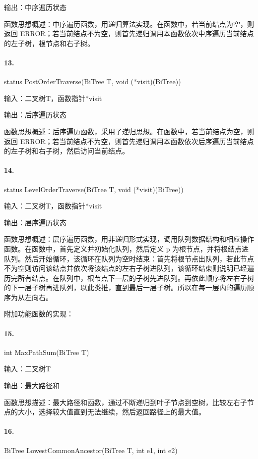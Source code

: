 \documentclass[supercite]{Experimental_Report}
\theoremstyle{definition}
\begin{document}
输出：中序遍历状态

函数思想概述：中序遍历函数，用递归算法实现。在函数中，若当前结点为空，则返回 ERROR；若当前结点不为空，则首先递归调用本函数依次中序遍历当前结点的左子树，根节点和右子树。

\paragraph{13.}status PostOrderTraverse(BiTree T, void (*visit)(BiTree))

输入：二叉树T，函数指针*visit

输出：后序遍历状态

函数思想概述：后序遍历函数，采用了递归思想。在函数中，若当前结点为空，则返回 ERROR；若当前结点不为空，则首先递归调用本函数依次后序遍历当前结点的左子树和右子树，然后访问当前结点。

\paragraph{14.}status LevelOrderTraverse(BiTree T, void (*visit)(BiTree))

输入：二叉树T，函数指针*visit

输出：层序遍历状态

函数思想概述：层序遍历函数，用非递归形式实现，调用队列数据结构和相应操作函数。在函数中，首先定义并初始化队列，然后定义 p 为根节点，并将根结点进队列。然后开始循环，该循环在队列为空时结束：首先将根节点出队列，若此节点不为空则访问该结点并依次将该结点的左右子树进队列，该循环结束则说明已经遍历完所有结点。在队列中，根节点下一层的子树先进队列。再依此顺序将左右子树的下一层子树再进队列，以此类推，直到最后一层子树。所以在每一层内的遍历顺序为从左向右。

附加功能函数的实现：

\paragraph{15.}int MaxPathSum(BiTree T)

输入：二叉树T

输出：最大路径和

函数思想描述：最大路径和函数，通过不断递归到叶子节点到空树，比较左右子节点的大小，选择较大值直到无法继续，然后返回路径上的最大值。

\paragraph{16.}BiTree LowestCommonAncestor(BiTree T, int e1, int e2)
\end{document}
